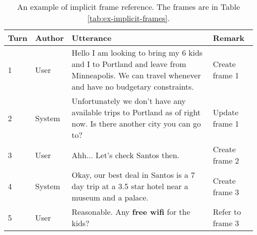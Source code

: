 \begin{table}
    \centering
    \caption[Implicit frame reference]{An example of implicit frame reference. The frames are in Table \ref{tab:ex-implicit-frames}.}
    \label{tab:ex-implicit}
    \begin{tabularx}{\textwidth}{llX|l}
        \toprule
        Turn & Author & Utterance & Remark \\
        \midrule
        1 & User & Hello I am looking to bring my 6 kids and I to Portland and leave from Minneapolis. We can travel whenever and have no budgetary constraints. & Create frame 1 \\
        2 & System & Unfortunately we don't have any available trips to Portland as of right now. Is there another city you can go to? & Update frame 1 \\
        3 & User & Ahh... Let's check Santos then. & Create frame 2 \\
        4 & System & Okay, our best deal in Santos is a 7 day trip at a 3.5 star hotel near a museum and a palace. & Create frame 3 \\
        5 & User & Reasonable. Any \textbf{free wifi} for the kids? & Refer to frame 3 \\
        \bottomrule
    \end{tabularx}
\end{table}

